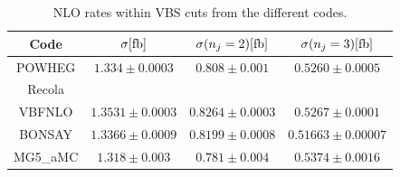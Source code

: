 \documentclass[a4paper,10pt]{report}
\begin{document}
\begin{table}[h!]
    \begin{tabular}{c|c|c|c}
        Code  &  $\sigma[\rm{fb}]$  &  $\sigma(n_j=2)[\rm{fb}]$  &  $\sigma(n_j=3)[\rm{fb}]$\\
        \hline
        \hline
        {\sc POWHEG}  &  $1.334 \pm 0.0003$  &  $0.808 \pm  0.001$  &  $0.5260 \pm 0.0005$\\
        {\sc Recola}  &  \\
        {\sc VBFNLO}  &  $1.3531 \pm 0.0003$  &  $0.8264 \pm  0.0003$  &  $0.5267 \pm 0.0001$\\
        {\sc BONSAY}  &  $1.3366 \pm 0.0009$  &  $0.8199 \pm  0.0008$  &  $0.51663 \pm 0.00007$ \\
        {\sc MG5\_aMC}&  $1.318  \pm 0.003$  &  $0.781 \pm  0.004$  &  $0.5374 \pm 0.0016$\\
    \end{tabular}
    \caption{\label{tab:NLOrates} NLO rates within VBS cuts from the different codes.}
\end{table}
\end{document}
